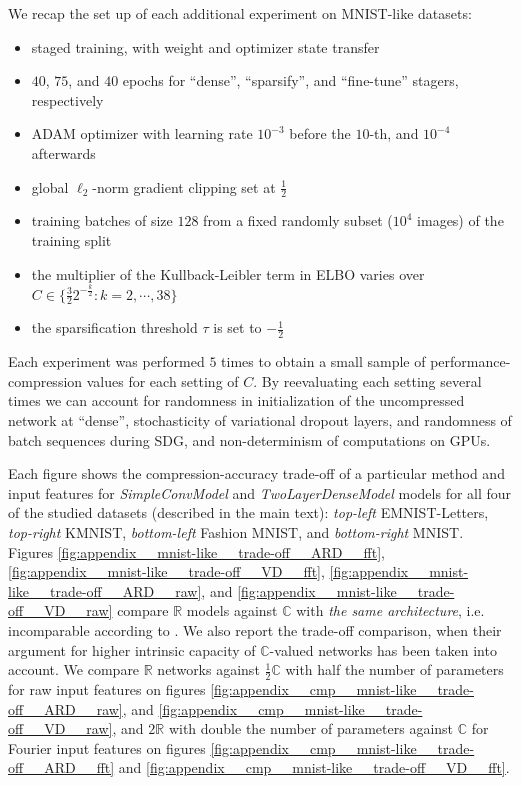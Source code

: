 \documentclass[a4paper]{extarticle}
\newcommand{\real}{\mathbb{R}}
\newcommand{\cplx}{\mathbb{C}}
\begin{document}
We recap the set up of each additional experiment on MNIST-like datasets:
\begin{itemize}
  \item staged training, with weight and optimizer state transfer
  \item $40$, $75$, and $40$ epochs for ``dense'', ``sparsify'', and ``fine-tune'' stagers, respectively
  \item ADAM optimizer with learning rate $10^{-3}$ before the $10$-th, and $10^{-4}$
  afterwards
  \item global $\ell_2$-norm gradient clipping set at $\tfrac12$
  \item training batches of size $128$ from a fixed randomly subset ($10^4$ images) of the training split
  \item the multiplier of the Kullback-Leibler term in ELBO varies over $
    C \in \{
      \tfrac32 2^{-\tfrac{k}2} \colon k=2, \cdots, 38
    \}
  $
  \item the sparsification threshold $\tau$ is set to $-\tfrac12$
\end{itemize}
Each experiment was performed $5$ times to obtain a small sample of performance-compression
values for each setting of $C$. By reevaluating each setting several times we can account
for randomness in initialization of the uncompressed network at ``dense'', stochasticity of
variational dropout layers, and randomness of batch sequences during SDG, and non-determinism
of computations on GPUs.

Each figure shows the compression-accuracy trade-off of a particular method and input features
for \textit{SimpleConvModel} and \textit{TwoLayerDenseModel} models for all four of the studied
datasets (described in the main text): \emph{top-left} EMNIST-Letters, \emph{top-right} KMNIST,
\emph{bottom-left} Fashion MNIST, and \emph{bottom-right} MNIST.
%
Figures \ref{fig:appendix__mnist-like__trade-off__ARD__fft}, \ref{fig:appendix__mnist-like__trade-off__VD__fft},
\ref{fig:appendix__mnist-like__trade-off__ARD__raw}, and \ref{fig:appendix__mnist-like__trade-off__VD__raw}
compare $\real$ models against $\cplx$ with \emph{the same architecture}, i.e. incomparable
according to \citet{monning_evaluation_2018}. We also report the trade-off comparison, when
their argument for higher intrinsic capacity of $\cplx$-valued networks has been taken
into account.
%
We compare $\real$ networks against $\tfrac12 \cplx$ with half the number of parameters
for raw input features on figures \ref{fig:appendix__cmp__mnist-like__trade-off__ARD__raw},
and \ref{fig:appendix__cmp__mnist-like__trade-off__VD__raw}, and $2 \real$ with
double the number of parameters against $\cplx$ for Fourier input features on figures
\ref{fig:appendix__cmp__mnist-like__trade-off__ARD__fft} and
\ref{fig:appendix__cmp__mnist-like__trade-off__VD__fft}.
\end{document}
